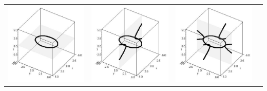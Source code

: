 \begin{center}
\begin{tabular}{cccc}
\includegraphics[width=\mywidth]{functions/quadric-1}&
\includegraphics[width=\mywidth]{functions/quadric-2}&
\includegraphics[width=\mywidth]{functions/quadric-3}&

\end{tabular}
\end{center}

